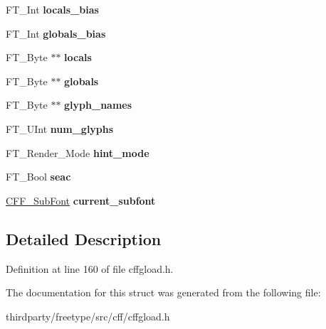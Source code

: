 \begin{DoxyCompactItemize}
F\+T\+\_\+\+Int {\bfseries locals\+\_\+bias}
\item 
\mbox{\label{struct_c_f_f___decoder___aa6070ea99029b41dfd2058bd80631889}} 
F\+T\+\_\+\+Int {\bfseries globals\+\_\+bias}
\item 
\mbox{\label{struct_c_f_f___decoder___a73ddc4c41f9d331b547ca3b747f18748}} 
F\+T\+\_\+\+Byte $\ast$$\ast$ {\bfseries locals}
\item 
\mbox{\label{struct_c_f_f___decoder___aadf635ae7bc701e672d45d15cf09668f}} 
F\+T\+\_\+\+Byte $\ast$$\ast$ {\bfseries globals}
\item 
\mbox{\label{struct_c_f_f___decoder___a0b0a776add983dbd3df97224eb56d18b}} 
F\+T\+\_\+\+Byte $\ast$$\ast$ {\bfseries glyph\+\_\+names}
\item 
\mbox{\label{struct_c_f_f___decoder___a8f41d4378dae59fe52c1451db80d25c6}} 
F\+T\+\_\+\+U\+Int {\bfseries num\+\_\+glyphs}
\item 
\mbox{\label{struct_c_f_f___decoder___a67906a908923c392f2cbe954da0dc545}} 
F\+T\+\_\+\+Render\+\_\+\+Mode {\bfseries hint\+\_\+mode}
\item 
\mbox{\label{struct_c_f_f___decoder___a51dad91cd321e76a470fe3fe6566b67f}} 
F\+T\+\_\+\+Bool {\bfseries seac}
\item 
\mbox{\label{struct_c_f_f___decoder___aba8d1c264e2001dd2ced04f81af8b7ac}} 
\hyperlink{struct_c_f_f___sub_font_rec__}{C\+F\+F\+\_\+\+Sub\+Font} {\bfseries current\+\_\+subfont}
\end{DoxyCompactItemize}


\subsection{Detailed Description}


Definition at line 160 of file cffgload.\+h.



The documentation for this struct was generated from the following file\+:\begin{DoxyCompactItemize}
\item 
thirdparty/freetype/src/cff/cffgload.\+h\end{DoxyCompactItemize}
